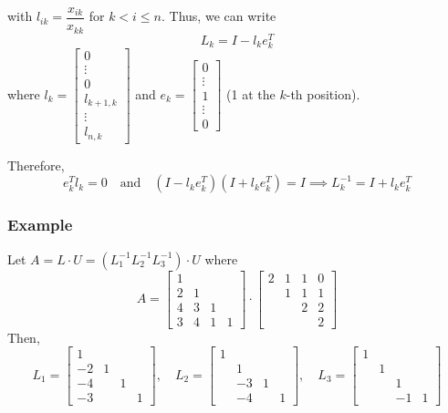 \documentclass[11pt]{article}
\begin{document}
with \( l_{ik} = \dfrac{x_{ik}}{x_{kk}} \) for \( k < i \leq n \). Thus, we can write
\[L_k = I - l_k e_k^T\]
where \( l_k = \begin{bmatrix}
    0 \\
    \vdots \\
    0 \\
    l_{k+1,k} \\
    \vdots \\
    l_{n,k}
\end{bmatrix} \) and \( e_k = \begin{bmatrix}
    0 \\
    \vdots \\
    1 \\
    \vdots \\
    0
\end{bmatrix} \) (1 at the \(k\)-th position).

Therefore,
\[e_k^T l_k = 0 \quad \text{and} \quad (I - l_k e_k^T)(I + l_k e_k^T) = I \implies L_k^{-1} = I + l_k e_k^T\]

\subsubsection*{Example}
Let \( A = L \cdot U = (L_1^{-1} L_2^{-1} L_3^{-1}) \cdot U \) where
\[A = \begin{bmatrix}
    1 & & & \\
    2 & 1 & & \\
    4 & 3 & 1 & \\
    3 & 4 & 1 & 1
\end{bmatrix} \cdot \begin{bmatrix}
    2 & 1 & 1 & 0 \\
    & 1 & 1 & 1 \\
    & & 2 & 2 \\
    & & & 2
\end{bmatrix}\]
Then,
\[L_1 = \begin{bmatrix}
    1 & & & \\
    -2 & 1 & & \\
    -4 & & 1 & \\
    -3 & & & 1
\end{bmatrix}, \quad L_2 = \begin{bmatrix}
    1 & & & \\
    & 1 & & \\
    & -3 & 1 & \\
    & -4 & & 1
\end{bmatrix}, \quad L_3 = \begin{bmatrix}
    1 & & & \\
    & 1 & & \\
    & & 1 & \\
    & & -1 & 1
\end{bmatrix}\]
\end{document}
